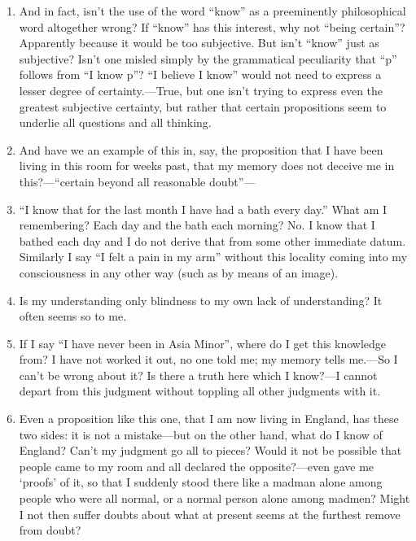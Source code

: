 \documentclass{book}
\begin{document}
\begin{enumerate}
\item
And in fact, isn't the use of the word ``know'' as a preeminently philosophical
word altogether wrong? If ``know'' has this interest, why not ``being
certain''? Apparently because it would be too subjective. But isn't ``know''
just as subjective? Isn't one misled simply by the grammatical peculiarity that
``p'' follows from ``I know p''?  ``I believe I know'' would not need to
express a lesser degree of certainty.---True, but one isn't trying to express
even the greatest subjective certainty, but rather that certain propositions
seem to underlie all questions and all thinking.

\item
And have we an example of this in, say, the proposition that I have been living
in this room for weeks past, that my memory does not deceive me in
this?---``certain beyond all reasonable doubt''---

\item
``I know that for the last month I have had a bath every day.'' What am I
remembering? Each day and the bath each morning? No. I know that I bathed each
day and I do not derive that from some other immediate datum. Similarly I say
``I felt a pain in my arm'' without this locality coming into my consciousness
in any other way (such as by means of an image).

\item
Is my understanding only blindness to my own lack of understanding? It often
seems so to me.

\item
If I say ``I have never been in Asia Minor'', where do I get this knowledge
from? I have not worked it out, no one told me; my memory tells me.---So I
can't be wrong about it? Is there a truth here which I know?---I cannot depart
from this judgment without toppling all other judgments with it.

\item
Even a proposition like this one, that I am now living in England, has these
two sides: it is not a mistake---but on the other hand, what do I know of
England? Can't my judgment go all to pieces?  Would it not be possible that
people came to my room and all declared the opposite?---even gave me `proofs'
of it, so that I suddenly stood there like a madman alone among people who were
all normal, or a normal person alone among madmen? Might I not then suffer
doubts about what at present seems at the furthest remove from doubt?


\end{enumerate}
\end{document}
